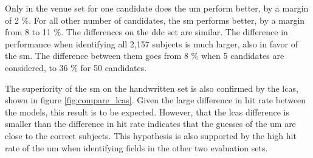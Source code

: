 Only in the venue set for one candidate does the \acrshort{um} perform better, by a margin of 2 \%. For all other number of candidates, the \acrshort{sm} performs better, by a margin from 8 to 11 \%. The differences on the \acrshort{ddc} set are similar. The difference in performance when identifying all 2,157 subjects is much larger, also in favor of the \acrshort{sm}. The difference between them goes from 8 \% when 5 candidates are considered, to 36 \% for 50 candidates.

The superiority of the \acrshort{sm} on the handwritten set is also confirmed by the \acrshort{lcas}, shown in figure \ref{fig:compare_lcas}. Given the large difference in hit rate between the models, this result is to be expected. However, that the \acrshort{lcas} difference is smaller than the difference in hit rate indicates that the guesses of the \acrshort{um} are close to the correct subjects. This hypothesis is also supported by the high hit rate of the \acrshort{um} when identifying fields in the other two evaluation sets.